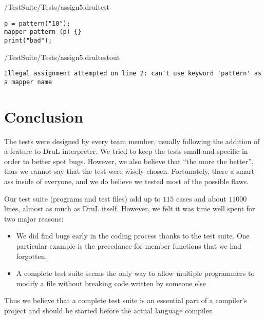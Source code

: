 /TestSuite/Tests/assign5.drultest
{\color{red}
\begin{verbatim}
p = pattern("10");
mapper pattern (p) {}
print("bad");
\end{verbatim}
}
/TestSuite/Tests/assign5.drultestout
{\color{blue}
\begin{verbatim}
Illegal assignment attempted on line 2: can't use keyword 'pattern' as a mapper name
\end{verbatim}
}



\section{Conclusion}
The tests were designed by every team member, usually following the addition
of a feature to DruL interpreter. We tried to keep the tests small and specific
in order to better spot bugs. However, we also believe that ``the more the
better'', thus we cannot say that the test were wisely chosen. Fortunately,
there a smart-ass inside of everyone, and we do believe we tested most of
the possible flaws.

Our test suite (programs and test files) add up to $115$ cases and 
about $11000$ lines, almost
as much as DruL itself. However, we felt it was time well spent for two major
reasons:
\begin{itemize}
\item We did find bugs early in the coding process thanks to the test suite. One
particular example is the precedance for member functions that we had forgotten.
\item A complete test suite seems the only way to allow multiple programmers to
modify a file without breaking code written by someone else
\end{itemize}
Thus we believe that a complete test suite is an essential part of a compiler's
project and should be started before the actual language compiler.

